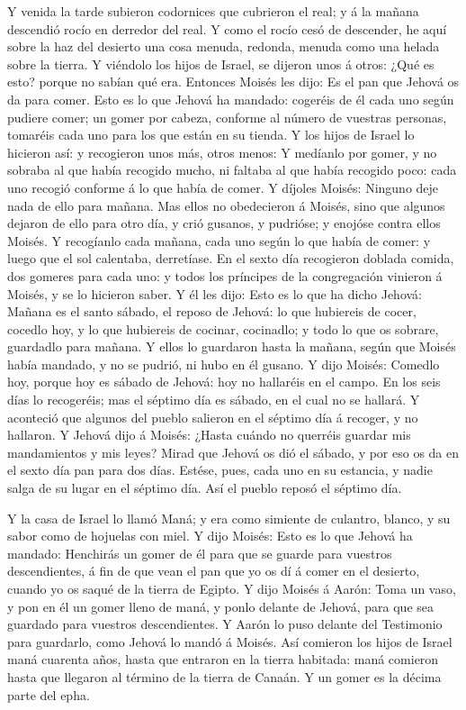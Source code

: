  Y venida la tarde subieron codornices que cubrieron el
real; y á la mañana descendió rocío en derredor del real. 
Y como el rocío cesó de descender, he aquí sobre la haz del desierto una
cosa menuda, redonda, menuda como una helada sobre la tierra.
 Y viéndolo los hijos de Israel, se dijeron unos á otros:
¿Qué es esto? porque no sabían qué era. Entonces Moisés les dijo: Es el
pan que Jehová os da para comer.  Esto es lo que Jehová ha
mandado: cogeréis de él cada uno según pudiere comer; un gomer por
cabeza, conforme al número de vuestras personas, tomaréis cada uno para
los que están en su tienda.  Y los hijos de Israel lo
hicieron así: y recogieron unos más, otros menos:  Y
medíanlo por gomer, y no sobraba al que había recogido mucho, ni faltaba
al que había recogido poco: cada uno recogió conforme á lo que había de
comer.  Y díjoles Moisés: Ninguno deje nada de ello para
mañana.  Mas ellos no obedecieron á Moisés, sino que
algunos dejaron de ello para otro día, y crió gusanos, y pudrióse; y
enojóse contra ellos Moisés.  Y recogíanlo cada mañana,
cada uno según lo que había de comer: y luego que el sol calentaba,
derretíase.  En el sexto día recogieron doblada comida, dos
gomeres para cada uno: y todos los príncipes de la congregación vinieron
á Moisés, y se lo hicieron saber.  Y él les dijo: Esto es
lo que ha dicho Jehová: Mañana es el santo sábado, el reposo de Jehová:
lo que hubiereis de cocer, cocedlo hoy, y lo que hubiereis de cocinar,
cocinadlo; y todo lo que os sobrare, guardadlo para mañana.
 Y ellos lo guardaron hasta la mañana, según que Moisés
había mandado, y no se pudrió, ni hubo en él gusano.  Y
dijo Moisés: Comedlo hoy, porque hoy es sábado de Jehová: hoy no
hallaréis en el campo.  En los seis días lo recogeréis; mas
el séptimo día es sábado, en el cual no se hallará.  Y
aconteció que algunos del pueblo salieron en el séptimo día á recoger, y
no hallaron.  Y Jehová dijo á Moisés: ¿Hasta cuándo no
querréis guardar mis mandamientos y mis leyes?  Mirad que
Jehová os dió el sábado, y por eso os da en el sexto día pan para dos
días. Estése, pues, cada uno en su estancia, y nadie salga de su lugar
en el séptimo día.  Así el pueblo reposó el séptimo día.

 Y la casa de Israel lo llamó Maná; y era como simiente de
culantro, blanco, y su sabor como de hojuelas con miel.  Y
dijo Moisés: Esto es lo que Jehová ha mandado: Henchirás un gomer de él
para que se guarde para vuestros descendientes, á fin de que vean el pan
que yo os dí á comer en el desierto, cuando yo os saqué de la tierra de
Egipto.  Y dijo Moisés á Aarón: Toma un vaso, y pon en él
un gomer lleno de maná, y ponlo delante de Jehová, para que sea guardado
para vuestros descendientes.  Y Aarón lo puso delante del
Testimonio para guardarlo, como Jehová lo mandó á Moisés. 
Así comieron los hijos de Israel maná cuarenta años, hasta que entraron
en la tierra habitada: maná comieron hasta que llegaron al término de la
tierra de Canaán.  Y un gomer es la décima parte del epha.

